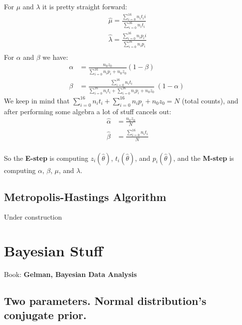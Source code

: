 \documentclass[]{article}
\begin{document}
For $\mu$ and $\lambda$ it is pretty straight forward:
$$
\begin{aligned}
  \hat{\mu} = \frac{\sum_{i=0}^{16} n_i t_i i }{\sum_{i=0}^{16} n_i t_i}\\
  \hat{\lambda} = \frac{\sum_{i=0}^{16} n_i p_i i }{\sum_{i=0}^{16} n_i p_i}\\
\end{aligned}
$$
For $\alpha$ and $\beta$ we have:
$$
\begin{aligned}
  \alpha &= \frac{ n_0 z_0   }{\sum_{i=0}^{16} n_i p_i   + n_0z_0}(1-\beta)\\
  \beta &= \frac{ \sum_{i=0}^{16} n_i t_i}{\sum_{i=0}^{16} n_i t_i + \sum_{i=0}^{16} n_i p_i   + n_0z_0}\ (1-\alpha)  \
\end{aligned}
$$
We keep in mind that $\sum_{i=0}^{16} n_i t_i + \sum_{i=0}^{16} n_i p_i   + n_0z_0 = N$ (total counts), and after performing some algebra a lot of stuff cancels out:
$$
\begin{aligned}
  \hat{\alpha} &= \frac{ n_0 z_0 }{N}\\
  \hat{\beta} &= \frac{ \sum_{i=0}^{16} n_i t_i}{N}\\
\end{aligned}
$$

So the \textbf{E-step} is computing $z_i(\hat{\theta})$, $t_i(\hat{\theta})$, and $p_i(\hat{\theta})$, and the \textbf{M-step} is computing $\alpha$, $\beta$, $\mu$, and $\lambda$.


\subsection{Metropolis-Hastings Algorithm}
Under construction
	
\section{Bayesian Stuff}
Book: \textbf{Gelman, Bayesian Data Analysis}
\subsection{Two parameters. Normal distribution's conjugate prior.}
\end{document}
